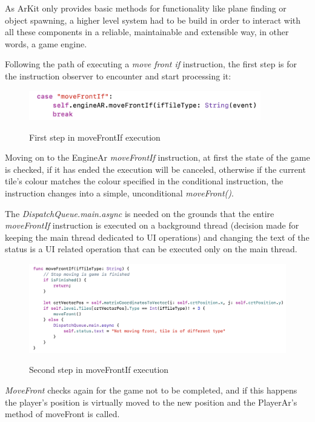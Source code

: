 \documentclass[12 pct]{report}
\begin{document}
As ArKit only provides basic methods for functionality like plane finding or object spawning, a higher level system had to be build in order to interact with all these components in a reliable, maintainable and extensible way, in other words, a game engine.

Following the path of executing a \textit{move front if} instruction, the first step is for the instruction observer to encounter and start processing  it:
\begin{figure}[H]
\includegraphics[width=0.9\textwidth]{move-front-if-1}
\centering
\label{fig:feature-points}
\caption{ First step in moveFrontIf execution }
\end{figure}

Moving on to the EngineAr \textit{moveFrontIf} instruction, at first the state of the game is checked, if it has ended the execution will be canceled, otherwise if the current tile's colour matches the colour specified in the conditional instruction, the instruction changes into a simple, unconditional \textit{moveFront()}.

The \textit{DispatchQueue.main.async} is needed on the grounds that the entire \textit{moveFrontIf} instruction is executed on a background thread (decision made for keeping the main thread dedicated to UI operations) and changing the text of the status is a UI related operation that can be executed only on the main thread.

\begin{figure}[H]
\includegraphics[width=1.0\textwidth]{move-front-if-2}
\centering
\label{fig:feature-points}
\caption{ Second step in moveFrontIf execution }
\end{figure}

\textit{MoveFront} checks again for the game not to be completed, and if this happens the player's position is virtually moved to the new position and the PlayerAr's method of moveFront is called. 
\end{document}
